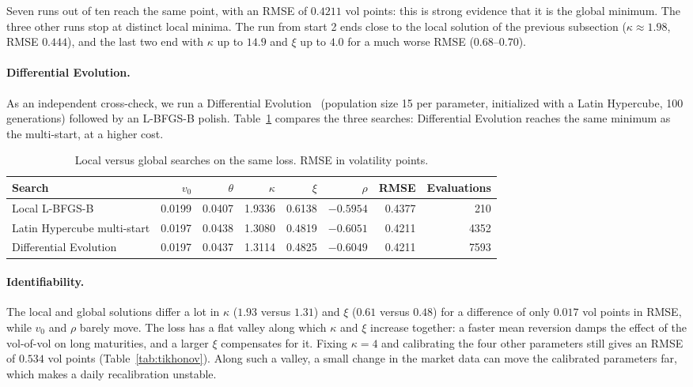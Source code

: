 \documentclass[11pt,a4paper]{article}
\theoremstyle{plain}
\theoremstyle{definition}
\begin{document}
Seven runs out of ten reach the same point, with an RMSE of $0.4211$ vol points: this is strong evidence that it is the global minimum. The three other runs stop at distinct local minima. The run from start 2 ends close to the local solution of the previous subsection ($\kappa\approx1.98$, RMSE $0.444$), and the last two end with $\kappa$ up to $14.9$ and $\xi$ up to $4.0$ for a much worse RMSE ($0.68$--$0.70$).

\paragraph{Differential Evolution.} As an independent cross-check, we run a Differential Evolution~\cite{storn} (population size 15 per parameter, initialized with a Latin Hypercube, 100 generations) followed by an L-BFGS-B polish. Table~\ref{tab:global} compares the three searches: Differential Evolution reaches the same minimum as the multi-start, at a higher cost.

\begin{table}[htbp]
\centering
\small
\begin{tabular}{@{}lrrrrrrr@{}}
\toprule
Search & $v_0$ & $\theta$ & $\kappa$ & $\xi$ & $\rho$ & RMSE & Evaluations \\
\midrule
Local L-BFGS-B & 0.0199 & 0.0407 & 1.9336 & 0.6138 & $-0.5954$ & 0.4377 & 210 \\
Latin Hypercube multi-start & 0.0197 & 0.0438 & 1.3080 & 0.4819 & $-0.6051$ & 0.4211 & 4352 \\
Differential Evolution & 0.0197 & 0.0437 & 1.3114 & 0.4825 & $-0.6049$ & 0.4211 & 7593 \\
\bottomrule
\end{tabular}
\caption{Local versus global searches on the same loss. RMSE in volatility points.}
\label{tab:global}
\end{table}

\paragraph{Identifiability.} The local and global solutions differ a lot in $\kappa$ ($1.93$ versus $1.31$) and $\xi$ ($0.61$ versus $0.48$) for a difference of only $0.017$ vol points in RMSE, while $v_0$ and $\rho$ barely move. The loss has a flat valley along which $\kappa$ and $\xi$ increase together: a faster mean reversion damps the effect of the vol-of-vol on long maturities, and a larger $\xi$ compensates for it. Fixing $\kappa=4$ and calibrating the four other parameters still gives an RMSE of $0.534$ vol points (Table~\ref{tab:tikhonov}). Along such a valley, a small change in the market data can move the calibrated parameters far, which makes a daily recalibration unstable.
\end{document}
